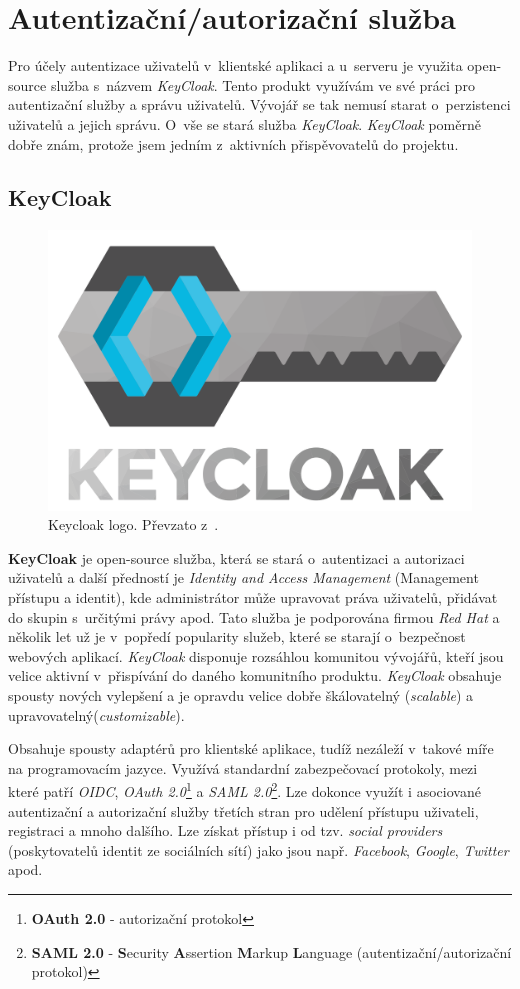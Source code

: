 \newpage
\section{Autentizační/autorizační služba}
\label{pouzite:auth}
Pro účely autentizace uživatelů v~klientské aplikaci a u~serveru je využita open-source služba s~názvem \emph{KeyCloak}.
Tento produkt využívám ve své práci pro autentizační služby a správu uživatelů.
Vývojář se tak nemusí starat o~perzistenci uživatelů a jejich správu.
O~vše se stará služba \emph{KeyCloak}.
\emph{KeyCloak} poměrně dobře znám, protože jsem jedním z~aktivních přispěvovatelů do projektu.

\subsection*{KeyCloak}
\label{terminy:keycloak}

\begin{figure}[hbt]
  \centering
  \includegraphics[width=.25 \linewidth]{obrazky-figures/keycloak2.png}
  \caption{Keycloak logo. Převzato z~\cite{keycloak}.}
\end{figure}

\textbf{KeyCloak} je open-source služba, která se stará o~autentizaci a autorizaci uživatelů a další předností je \emph{Identity and Access Management} (Management přístupu a identit),
kde administrátor může upravovat práva uživatelů, přidávat do skupin s~určitými právy apod.
Tato služba je podporována firmou \emph{Red Hat} a několik let už je v~popředí popularity služeb, které se starají o~bezpečnost webových aplikací. \emph{KeyCloak} disponuje rozsáhlou komunitou vývojářů, kteří jsou velice aktivní v~přispívání do daného komunitního produktu.
\emph{KeyCloak} obsahuje spousty nových vylepšení a je opravdu velice dobře škálovatelný (\emph{scalable}) a upravovatelný(\emph{customizable}).

Obsahuje spousty adaptérů pro klientské aplikace, tudíž nezáleží v~takové míře na programovacím jazyce.
Využívá standardní zabezpečovací protokoly, mezi které patří \emph{OIDC}, \emph{OAuth 2.0}\footnote{\textbf{OAuth 2.0} - autorizační protokol} a \emph{SAML 2.0}\footnote{\textbf{SAML 2.0} - \textbf{S}ecurity \textbf{A}ssertion \textbf{M}arkup \textbf{L}anguage (autentizační/autorizační protokol)}.
Lze dokonce využít i asociované autentizační a autorizační služby třetích stran pro udělení přístupu uživateli, registraci a mnoho dalšího.
Lze získat přístup i od tzv. \emph{social providers} (poskytovatelů identit ze sociálních sítí) jako jsou např. \emph{Facebook}, \emph{Google}, \emph{Twitter} apod.


